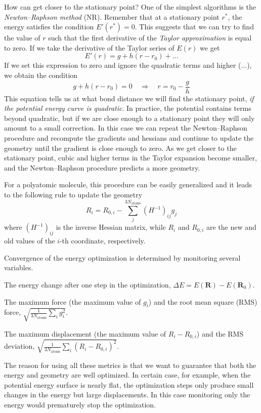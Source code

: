 \documentclass[../Main/notes.tex]{subfiles}
\begin{document}
How can get closer to the stationary point?
One of the simplest algorithms is the \emph{Newton--Raphson method} (NR).
Remember that at a stationary point $r^*$, the energy satisfies the condition $E'(r^*) = 0$. This suggests that we can try to find the value of $r$ such that the first derivative of the \emph{Taylor approximation} is equal to zero.
If we take the derivative of the Taylor series of $E(r)$ we get
\begin{equation}
E'(r)  = g + h (r - r_0) + \ldots 
\end{equation}
If we set this expression to zero and ignore the quadratic terms and higher ($\ldots$), we obtain the condition
\begin{equation}
g + h ( r - r_0) = 0 \quad \Rightarrow 
\quad 
r = r_0 - \frac{g}{h}
\end{equation}
This equation tells us at what bond distance we will find the stationary point, \emph{if the potential energy curve is quadratic}. In practice, the potential contains terms beyond quadratic, but if we are close enough to a stationary point they will only amount to a small correction.
In this case we can repeat the Newton--Raphson procedure and recompute the gradients and hessians and continue to update the geometry until the gradient is close enough to zero.
As we get closer to the stationary point, cubic and higher terms in the Taylor expansion become smaller, and the Newton--Raphson procedure predicts a more geometry.

For a polyatomic molecule, this procedure can be easily generalized and it leads to the following rule to update the geometry
\begin{equation}
R_i = R_{0,i} - \sum_{j}^{3 N_\mathrm{atoms}}(H^{-1})_{ij} g_j
\end{equation}
where $(H^{-1})_{ij}$ is the inverse Hessian matrix, while $R_i$ and $R_{0,i}$ are the new and old values of the $i$-th coordinate, respectively.

Convergence of the energy optimization is determined by monitoring several variables.
\begin{myitems}
\item The energy change after one step in the optimization, $\Delta E = E(\mathbf{R}) - E(\mathbf{R}_0)$.
\item The maximum force (the maximum value of $g_i$) and the root mean square (RMS) force, $\sqrt{\frac{1}{3 N_\mathrm{atoms}}\sum_i g_i^2}$.
\item The maximum displacement (the maximum value of $R_i - R_{0,i}$) and the RMS deviation, $\sqrt{\frac{1}{3 N_\mathrm{atoms}}\sum_i (R_i - R_{0,i})^2}$.
\end{myitems}
The reason for using all these metrics is that we want to guarantee that both the energy and geometry are well optimized.
In certain case, for example, when the potential energy surface is nearly flat, the optimization steps only produce small changes in the energy but large displacements.
In this case monitoring only the energy would prematurely stop the optimization.
\end{document}
